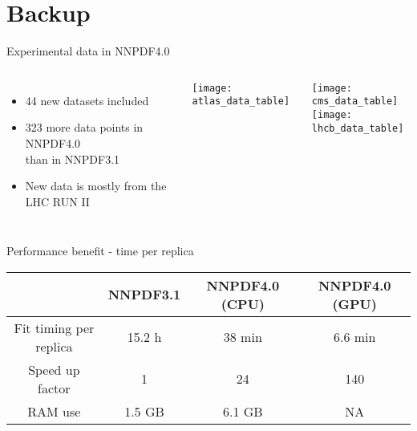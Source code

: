 
\appendix

\section{Backup}

\begin{frame}{Experimental data in NNPDF4.0}
    \vspace*{-1em}
    \begin{columns}
            {\footnotesize
            \begin{itemize}
                \item 44 new datasets included
                \item 323 more data points in NNPDF4.0 \\ than in NNPDF3.1
                \item New data is mostly from the LHC RUN II
            \end{itemize}
            }
            \texttt{[image: atlas\_data\_table]}
    
            \texttt{[image: cms\_data\_table]} \\
            \texttt{[image: lhcb\_data\_table]}
    \end{columns}
\end{frame}





\begin{frame}{Performance benefit - time per replica}
  \begin{table}
     \renewcommand{\arraystretch}{1.50}
    \centering
    \begin{tabular}{c | c | c | c} \toprule
      & NNPDF3.1  & NNPDF4.0 (CPU) & NNPDF4.0  (GPU) \\
            \midrule
      Fit timing per replica    & 15.2 h        & 38 min        & 6.6 min \\ \hline
             Speed up factor    & 1        &  24      & 140 \\ \hline
      RAM use &  1.5 GB          &  6.1 GB                 & NA  \\ \bottomrule
    \end{tabular}
  \end{table}
  \vspace*{1em}
\end{frame}


